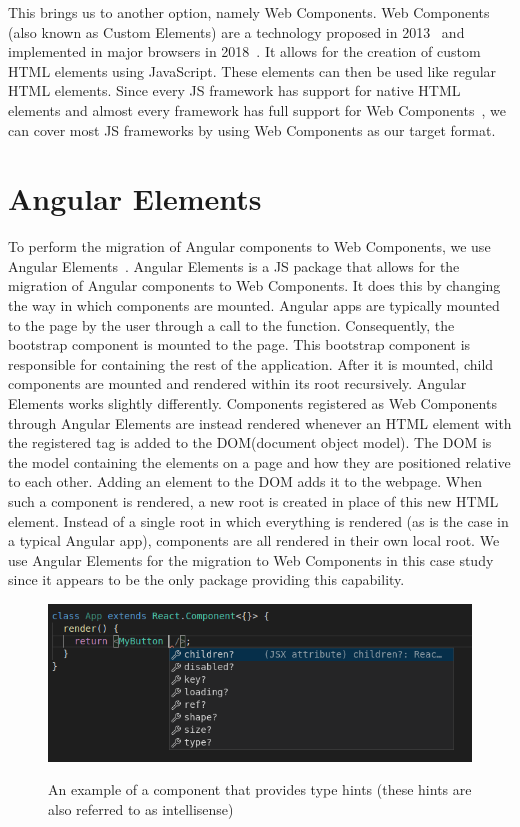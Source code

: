 This brings us to another option, namely Web Components. Web Components (also known as Custom Elements) are a technology proposed in 2013~ and implemented in major browsers in 2018~. It allows for the creation of custom HTML elements using JavaScript. These elements can then be used like regular HTML elements. Since every JS framework has support for native HTML elements and almost every framework has full support for Web Components~, we can cover most JS frameworks by using Web Components as our target format.

\section{Angular Elements}\label{sec:bg:angularelements}
To perform the migration of Angular components to Web Components, we use Angular Elements~. Angular Elements is a JS package that allows for the migration of Angular components to Web Components. It does this by changing the way in which components are mounted. Angular apps are typically mounted to the page by the user through a call to the  function. Consequently, the bootstrap component is mounted to the page. This bootstrap component is responsible for containing the rest of the application. After it is mounted, child components are mounted and rendered within its root recursively. Angular Elements works slightly differently. Components registered as Web Components through Angular Elements are instead rendered whenever an HTML element with the registered tag is added to the DOM\@ (document object model). The DOM is the model containing the elements on a page and how they are positioned relative to each other. Adding an element to the DOM adds it to the webpage. When such a component is rendered, a new root is created in place of this new HTML element. Instead of a single root in which everything is rendered (as is the case in a typical Angular app), components are all rendered in their own local root. We use Angular Elements for the migration to Web Components in this case study since it appears to be the only package providing this capability.

\begin{figure}[h]
  \caption{An example of a component that provides type hints (these hints are also referred to as intellisense)}
  \includegraphics[width=\columnwidth]{figures/background/hinting.png}
  \label{fig:bg:hinting}
  \centering
\end{figure}

